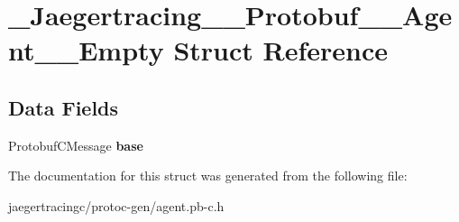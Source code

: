 \hypertarget{struct__Jaegertracing____Protobuf____Agent____Empty}{}\section{\+\_\+\+Jaegertracing\+\_\+\+\_\+\+Protobuf\+\_\+\+\_\+\+Agent\+\_\+\+\_\+\+Empty Struct Reference}
\label{struct__Jaegertracing____Protobuf____Agent____Empty}
\subsection*{Data Fields}
\begin{DoxyCompactItemize}
\item 
\mbox{\label{struct__Jaegertracing____Protobuf____Agent____Empty_a9643ec95a09a5bb987dca04cd6bd2b98}} 
Protobuf\+C\+Message {\bfseries base}
\end{DoxyCompactItemize}


The documentation for this struct was generated from the following file\+:\begin{DoxyCompactItemize}
\item 
jaegertracingc/protoc-\/gen/agent.\+pb-\/c.\+h\end{DoxyCompactItemize}
